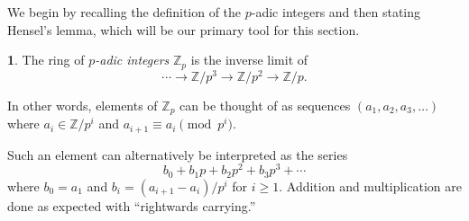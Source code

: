 \documentclass[10pt,a4paper]{amsart}
\numberwithin{equation}{section}
\numberwithin{figure}{section}
\theoremstyle{definition}
\theoremstyle{remark}
\theoremstyle{plain}
\theoremstyle{plain}
\theoremstyle{definition}
\newtheorem{defn}{\protect\definitionname}[section]
\theoremstyle{plain}
\theoremstyle{plain}
\providecommand{\definitionname}{Definition}
\newcommand{\F}{\mathbb{F}}
\newcommand{\Z}{\mathbb{Z}}
\begin{document}
	We begin by recalling the definition of the $p$-adic integers and then stating Hensel's lemma, which will be our primary tool for this section.
	\begin{defn}
		The ring of \emph{$p$-adic integers} $\Z_p$ is the inverse limit of
		\[
		\cdots \to \Z/p^3 \to \Z/p^2 \to \Z/p.
		\]
	\end{defn}
	In other words, elements of $\Z_p$ can be thought of as sequences $(a_1,a_2,a_3,\ldots)$ where $a_i \in \Z/p^i$ and $a_{i+1} \equiv a_i \pmod p^{i}$.
	
	Such an element can alternatively be interpreted as the series
	\[
	b_0 + b_1 p + b_2 p^2 + b_3 p^3 + \cdots
	\]
	where $b_0 = a_1$ and $b_i = (a_{i+1} - a_i)/p^i$ for $i \geq 1$. Addition and multiplication are done as expected with ``rightwards carrying.''
	
		
\end{document}
